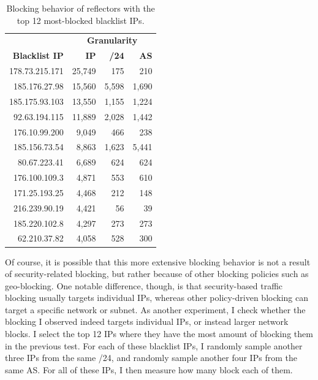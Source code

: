 \begin{table}[t]
\centering
\caption{Blocking behavior of reflectors with the top 12 most-blocked
  blacklist IPs.}
\begin{tabular}{r  r  r  r}
 \toprule
                         & \multicolumn{3}{c}{\textbf{Granularity}} \\
 \textbf{Blacklist IP}   & \textbf{IP}  & \textbf{/24}   & \textbf{AS}\\
 \midrule
 178.73.215.171             & 25,749                 & 175        & 210     \\
 185.176.27.98              & 15,560                 & 5,598      & 1,690   \\
 185.175.93.103             & 13,550                 & 1,155      & 1,224   \\
 92.63.194.115              & 11,889                 & 2,028      & 1,442   \\
 176.10.99.200              & 9,049                  & 466        & 238     \\
 185.156.73.54              & 8,863                  & 1,623      & 5,441   \\
 80.67.223.41               & 6,689                  & 624       & 624      \\
 176.100.109.3              & 4,871                  & 553       & 610      \\
 171.25.193.25              & 4,468                  & 212       & 148      \\
 216.239.90.19              & 4,421                  & 56        & 39       \\
 185.220.102.8              & 4,297                  & 273       & 273      \\
 62.210.37.82               & 4,058                  & 528       & 300      \\
 \bottomrule
\end{tabular}

\label{tab:super-malicious-ips}
\end{table}



Of course, it is possible that this more extensive blocking behavior
is not a result of security-related blocking, but rather because of
other blocking policies such as geo-blocking.  One notable difference,
though, is that security-based traffic blocking usually targets
individual IPs, whereas other policy-driven blocking can target a
specific network or subnet.  As another experiment, I check whether
the blocking I observed indeed targets individual IPs, or instead
larger network blocks.  I select the top 12 IPs where they have
the most amount of {} blocking them in the previous test.
For each of these blacklist IPs, I randomly sample
another three IPs from the same /24, and randomly sample another four
IPs from the same AS.  For all of these IPs, I then measure how many
{} block each of them.

